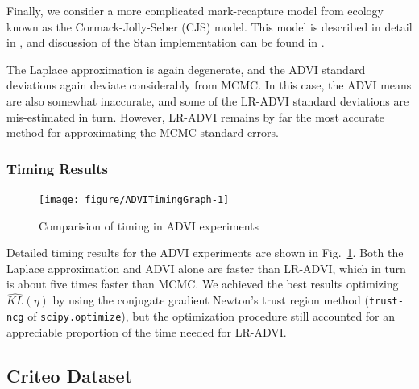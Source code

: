 \documentclass{article}\usepackage[]{graphicx}\usepackage[]{color}
\newenvironment{knitrout}{}{}
\theoremstyle{definition}
\theoremstyle{plain}
\theoremstyle{plain}
\theoremstyle{plain}
\theoremstyle{definition}
\theoremstyle{plain}
\theoremstyle{plain}
\newcommand{\fig}[1]{Fig.~\ref{fig:#1}}
\begin{document}
Finally, we consider a more complicated mark-recapture model from
ecology known as the Cormack-Jolly-Seber (CJS) model. This model is
described in detail in \citet[Chapter 7]{kery:2011:bpa}, and discussion
of the Stan implementation can be found in \citet[Section 15.3]{stan-manual:2015}.

The Laplace approximation is again degenerate, and the ADVI standard
deviations again deviate considerably from MCMC. In this case, the
ADVI means are also somewhat inaccurate, and some of the LR-ADVI standard
deviations are mis-estimated in turn. However, LR-ADVI remains by
far the most accurate method for approximating the MCMC standard errors.

\subsubsection{Timing Results\label{subsec:advi_timing}}

\begin{knitrout}
\color{fgcolor}\begin{figure}[t]

{\centering \texttt{[image: figure/ADVITimingGraph-1]} 

}

\caption[Comparision of timing in ADVI experiments]{Comparision of timing in ADVI experiments}\label{fig:ADVITimingGraph}
\end{figure}


\end{knitrout}

Detailed timing results for the ADVI experiments are shown in \fig{ADVITimingGraph}.
Both the Laplace approximation and ADVI alone are faster than LR-ADVI,
which in turn is about five times faster than MCMC. We achieved the best
results optimizing $\widehat{KL}\left(\eta\right)$ by using the conjugate
gradient Newton's trust region method (\texttt{trust-ncg} of \texttt{scipy.optimize}),
but the optimization procedure still accounted for an appreciable
proportion of the time needed for LR-ADVI.
 
\subsection{Criteo Dataset
\label{subsec:glmm_model}}
\end{document}
